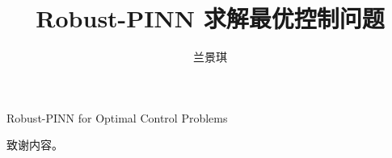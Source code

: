 \documentclass{xmu}
\theoremstyle{plain}
\theoremstyle{remark}
\begin{document}

\print %
\title{Robust-PINN 求解最优控制问题}{Robust-PINN for Optimal Control Problems}
\author{兰景琪}
\subject{信息与计算数学}


\maketitle


\begin{acknowledgement}
    致谢内容。
\end{acknowledgement}

\end{document}

